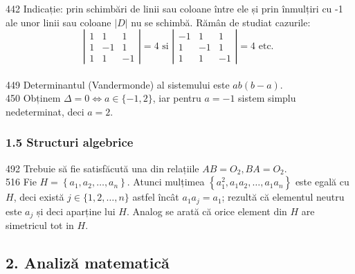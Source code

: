 \documentclass[11pt]{article}
\begin{document}
442 Indicație: prin schimbări de linii sau coloane între ele și prin înmulțiri cu -1 ale unor linii sau coloane $|D|$ nu se schimbă. Rămân de studiat cazurile: $$\left|\begin{array}{ccc}1 & 1 & 1 \\1 & -1 & 1 \\1 & 1 & -1\end{array}\right|=4 \text { si }\left|\begin{array}{ccc}-1 & 1 & 1 \\1 & -1 & 1 \\1 & 1 & -1\end{array}\right|=4 \text { etc. }$$\\
449 Determinantul (Vandermonde) al sistemului este $a b(b-a)$.\\
450 Obținem $\Delta=0 \Leftrightarrow a \in\{-1,2\}$, iar pentru $a=-1$ sistem simplu nedeterminat, deci $a=2$.\\

\subsubsection*{1.5 Structuri algebrice}
492 Trebuie să fie satisfăcută una din relațiile $A B=O_{2}, B A=O_{2}$.\\
516 Fie $H=\left\{a_{1}, a_{2}, \ldots, a_{n}\right\}$. Atunci mulțimea $\left\{a_{1}^{2}, a_{1} a_{2}, \ldots, a_{1} a_{n}\right\}$ este egală cu $H$, deci există $j \in\{1,2, \ldots, n\}$ astfel încât $a_{1} a_{j}=a_{1}$; rezultă că elementul neutru este $a_{j}$ și deci aparține lui $H$. Analog se arată că orice element din $H$ are simetricul tot in $H$.\\ 

\subsection*{2. Analiză matematică}
\end{document}
